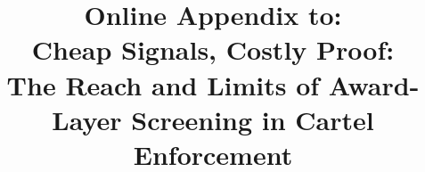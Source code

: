 \documentclass[12pt,authoryear]{elsarticle}
\begin{document}
\sloppy
\hfuzz=300pt

\begin{frontmatter}

\title{Online Appendix to:\\
Cheap Signals, Costly Proof:\\
The Reach and Limits of Award-Layer Screening in Cartel Enforcement}

\author{}

\end{frontmatter}

\appendix

\setcounter{table}{0}
\setcounter{figure}{0}
\renewcommand{\thetable}{\Alph{section}.\arabic{table}}
\renewcommand{\thefigure}{\Alph{section}.\arabic{figure}}
\makeatletter
{}
\makeatother

\end{document}
